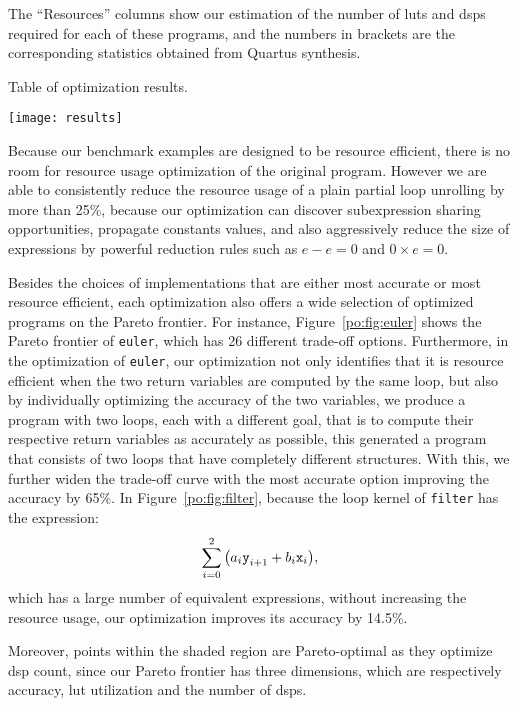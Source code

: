 The ``Resources'' columns show our estimation of the number of \glspl{lut}
and \glspl{dsp} required for each of these programs, and the numbers in
brackets are the corresponding statistics obtained from Quartus synthesis.

\begin{table}[ht]
    \centering
    \caption{
        Table of optimization results.
    }\label{po:fig:results}
    \texttt{[image: results]}
\end{table}

Because our benchmark examples are designed to be resource efficient, there
is no room for resource usage optimization of the original program.  However
we are able to consistently reduce the resource usage of a plain partial
loop unrolling by more than 25\%, because our optimization can discover
subexpression sharing opportunities, propagate constants values, and also
aggressively reduce the size of expressions by powerful reduction rules such as
$e - e = 0$ and $0 \times e = 0$.

Besides the choices of implementations that are either most accurate or most
resource efficient, each optimization also offers a wide selection of optimized
programs on the Pareto frontier.  For instance, Figure~\ref{po:fig:euler}
shows the Pareto frontier of \texttt{euler}, which has 26 different trade-off
options.  Furthermore, in the optimization of \texttt{euler}, our optimization
not only identifies that it is resource efficient when the two return variables
are computed by the same loop, but also by individually optimizing the
accuracy of the two variables, we produce a program with two loops, each with
a different goal, that is to compute their respective return variables as
accurately as possible, this generated a program that consists of two loops
that have completely different structures.  With this, we further widen the
trade-off curve with the most accurate option improving the accuracy by 65\%.
In Figure~\ref{po:fig:filter}, because the loop kernel of \texttt{filter}
has the expression:
\begin{equation}
    \sum_{i=0}^2{\left( a_i \texttt{y}_{i+1} + b_i \texttt{x}_i \right)},
\end{equation}
which has a large number of equivalent expressions, without increasing the
resource usage, our optimization improves its accuracy by 14.5\%.

Moreover, points within the shaded region are Pareto-optimal as they optimize
\gls{dsp} count, since our Pareto frontier has three dimensions, which are
respectively accuracy, \gls{lut} utilization and the number of \glspl{dsp}.

